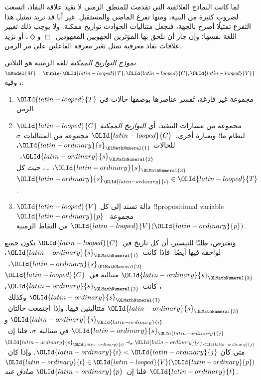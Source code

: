 \documentclass[../../../include/open-logic-section]{subfiles}
\begin{document}


لما كانت النماذج العلائقية التي تقدمت للمنطق الزمني لا تقيد علاقة النفاذ،
اتسعت لضروب كثيرة من البنية، ومنها تفرع الماضي والمستقبل. غير أنا قد نريد
تمثيل هذا التفرع تمثيلًا أصرح بالجهة، فنجعل متتاليات الحوادث تواريخ ممكنة.
ولا يوجب ذلك تغيير اللغة نفسها؛ وإن جاز أن نلحق بها المؤثرين الجهويين
المعهودين~$\Box$ و$\Diamond$، أو نزيد علاقات نفاذ معرفية تمثل تغير معرفة
الفاعلين على مر الزمن.

\begin{defn}
  \emph{نموذج التواريخ الممكنة} للغة الزمنية هو الثلاثي
  $\mModel{M}=\tuple{\OLId{latin-looped}{T},\OLId{latin-looped}{C},\OLId{latin-looped}{V}}$، وفيه:
  \begin{enumerate}
    \item $\OLId{latin-looped}{T}$ مجموعة غير فارغة، تُفسر عناصرها بوصفها حالات في الزمن.
    \item $\OLId{latin-looped}{C}$ مجموعة من مسارات التنفيذ، أي \emph{التواريخ الممكنة}
      لنظام ما؛ وبعبارة أخرى،~$\OLId{latin-looped}{C}$ مجموعة من المتتاليات~$\sigma$ للحالات
      $\OLId{latin-ordinary}{s}_\OLMathNumeral{1}$، $\OLId{latin-ordinary}{s}_\OLMathNumeral{2}$،~$\OLId{latin-ordinary}{s}_\OLMathNumeral{3}$، \dots، حيث كل~$\OLId{latin-ordinary}{s}_\OLId{latin-ordinary}{i} \in \OLId{latin-looped}{T}$.
    \item $\OLId{latin-looped}{V}$ دالة تسند إلى كل~!!{propositional
      variable}~$\OLId{latin-ordinary}{p}$ مجموعة~$\OLId{latin-looped}{V}(\OLId{latin-ordinary}{p})$ من النقاط الزمنية.
  \end{enumerate}
  ونفترض، طلبًا للتيسير، أن كل تاريخ في~$\OLId{latin-looped}{C}$ تكون جميع لواحقه فيها أيضًا.
  فإذا كانت~$\OLId{latin-ordinary}{s}_\OLMathNumeral{1}$، $\OLId{latin-ordinary}{s}_\OLMathNumeral{2}$،~$\OLId{latin-ordinary}{s}_\OLMathNumeral{3}$ متتالية في~$\OLId{latin-looped}{C}$، كانت~$\OLId{latin-ordinary}{s}_\OLMathNumeral{2}$، $\OLId{latin-ordinary}{s}_\OLMathNumeral{3}$
  وكذلك~$\OLId{latin-ordinary}{s}_\OLMathNumeral{3}$ متتاليتين فيها. وإذا اجتمعت حالتان~$\OLId{latin-ordinary}{s}_\OLId{latin-ordinary}{i}$ و$\OLId{latin-ordinary}{s}_\OLId{latin-ordinary}{j}$ في
  متتالية~$\sigma$، قلنا إن~$\OLId{latin-ordinary}{s}_\OLId{latin-ordinary}{i} \prec_\sigma \OLId{latin-ordinary}{s}_\OLId{latin-ordinary}{j}$ متى كان $\OLId{latin-ordinary}{i}<\OLId{latin-ordinary}{j}$.
  وإذا كان~$\OLId{latin-ordinary}{t} \in \OLId{latin-looped}{V}(\OLId{latin-ordinary}{p})$ قلنا إن~$\OLId{latin-ordinary}{p}$ \emph{صادق عند}~$\OLId{latin-ordinary}{t}$.
\end{defn}
\end{document}
